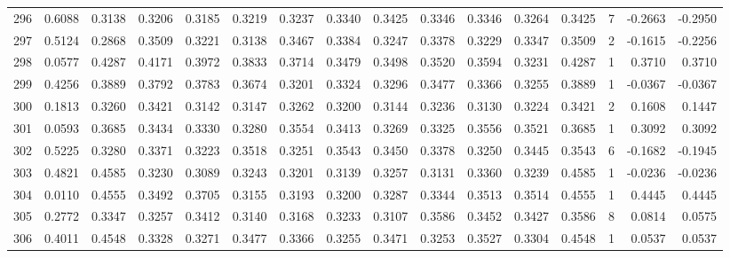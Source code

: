 \begin{tabular}{lrrrrrrrrrrrrrrr}
296 &      0.6088 &  0.3138 &  0.3206 &  0.3185 &  0.3219 &  0.3237 &  0.3340 &  0.3425 &  0.3346 &  0.3346 &   0.3264 &     0.3425 &      7 &                   -0.2663 &                    -0.2950 \\
297 &      0.5124 &  0.2868 &  0.3509 &  0.3221 &  0.3138 &  0.3467 &  0.3384 &  0.3247 &  0.3378 &  0.3229 &   0.3347 &     0.3509 &      2 &                   -0.1615 &                    -0.2256 \\
298 &      0.0577 &  0.4287 &  0.4171 &  0.3972 &  0.3833 &  0.3714 &  0.3479 &  0.3498 &  0.3520 &  0.3594 &   0.3231 &     0.4287 &      1 &                    0.3710 &                     0.3710 \\
299 &      0.4256 &  0.3889 &  0.3792 &  0.3783 &  0.3674 &  0.3201 &  0.3324 &  0.3296 &  0.3477 &  0.3366 &   0.3255 &     0.3889 &      1 &                   -0.0367 &                    -0.0367 \\
300 &      0.1813 &  0.3260 &  0.3421 &  0.3142 &  0.3147 &  0.3262 &  0.3200 &  0.3144 &  0.3236 &  0.3130 &   0.3224 &     0.3421 &      2 &                    0.1608 &                     0.1447 \\
301 &      0.0593 &  0.3685 &  0.3434 &  0.3330 &  0.3280 &  0.3554 &  0.3413 &  0.3269 &  0.3325 &  0.3556 &   0.3521 &     0.3685 &      1 &                    0.3092 &                     0.3092 \\
302 &      0.5225 &  0.3280 &  0.3371 &  0.3223 &  0.3518 &  0.3251 &  0.3543 &  0.3450 &  0.3378 &  0.3250 &   0.3445 &     0.3543 &      6 &                   -0.1682 &                    -0.1945 \\
303 &      0.4821 &  0.4585 &  0.3230 &  0.3089 &  0.3243 &  0.3201 &  0.3139 &  0.3257 &  0.3131 &  0.3360 &   0.3239 &     0.4585 &      1 &                   -0.0236 &                    -0.0236 \\
304 &      0.0110 &  0.4555 &  0.3492 &  0.3705 &  0.3155 &  0.3193 &  0.3200 &  0.3287 &  0.3344 &  0.3513 &   0.3514 &     0.4555 &      1 &                    0.4445 &                     0.4445 \\
305 &      0.2772 &  0.3347 &  0.3257 &  0.3412 &  0.3140 &  0.3168 &  0.3233 &  0.3107 &  0.3586 &  0.3452 &   0.3427 &     0.3586 &      8 &                    0.0814 &                     0.0575 \\
306 &      0.4011 &  0.4548 &  0.3328 &  0.3271 &  0.3477 &  0.3366 &  0.3255 &  0.3471 &  0.3253 &  0.3527 &   0.3304 &     0.4548 &      1 &                    0.0537 &                     0.0537 \\

\end{tabular}
